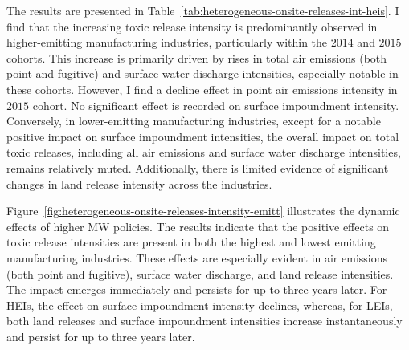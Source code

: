 \documentclass[authoryear, preprint, twocolumn, 1p]{elsarticle}
\begin{document}
    The results are presented in Table~\ref{tab:heterogeneous-onsite-releases-int-heis}. I find that the increasing toxic release intensity is predominantly observed in higher-emitting manufacturing industries, particularly within the $2014$ and $2015$ cohorts. This increase is primarily driven by rises in total air emissions (both point and fugitive) and surface water discharge intensities, especially notable in these cohorts. However, I find a decline effect in point air emissions intensity in $2015$ cohort. No significant effect is recorded on surface impoundment intensity. Conversely, in lower-emitting manufacturing industries, except for a notable positive impact on surface impoundment intensities, the overall impact on total toxic releases, including all air emissions and surface water discharge intensities, remains relatively muted. Additionally, there is limited evidence of significant changes in land release intensity across the industries.
    

    Figure~\ref{fig:heterogeneous-onsite-releases-intensity-emitt} illustrates the dynamic effects of higher MW policies. The results indicate that the positive effects on toxic release intensities are present in both the highest and lowest emitting manufacturing industries. These effects are especially evident in air emissions (both point and fugitive), surface water discharge, and land release intensities. The impact emerges immediately and persists for up to three years later. For HEIs, the effect on surface impoundment intensity declines, whereas, for LEIs, both land releases and surface impoundment intensities increase instantaneously and persist for up to three years later.
\end{document}
